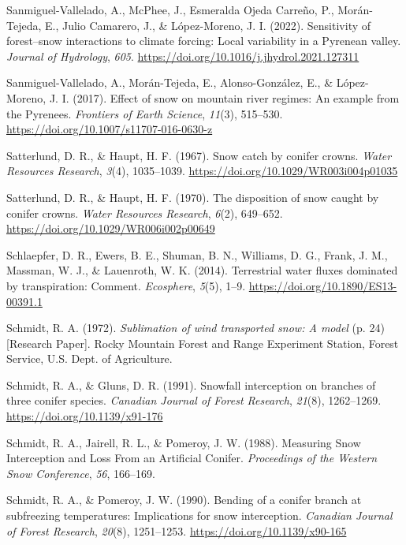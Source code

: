 \documentclass[
  letterpaper,
]{tex/uofsthesis-cs}
\newlength{\cslhangindent}
\newenvironment{CSLReferences}[2] %
 {\begin{list}{}{%
  \setlength{\itemindent}{0pt}
  \setlength{\leftmargin}{0pt}
  \setlength{\parsep}{0pt}
  \ifodd #1
   \setlength{\leftmargin}{\cslhangindent}
   \setlength{\itemindent}{-1\cslhangindent}
  \fi
  \setlength{\itemsep}{#2\baselineskip}}}
 {\end{list}}
\begin{document}
\begin{CSLReferences}{1}{0}
Sanmiguel-Vallelado, A., McPhee, J., Esmeralda Ojeda Carreño, P.,
Morán-Tejeda, E., Julio Camarero, J., \& López-Moreno, J. I. (2022).
Sensitivity of forest--snow interactions to climate forcing: {Local}
variability in a {Pyrenean} valley. \emph{Journal of Hydrology},
\emph{605}. \url{https://doi.org/10.1016/j.jhydrol.2021.127311}

Sanmiguel-Vallelado, A., Morán-Tejeda, E., Alonso-González, E., \&
López-Moreno, J. I. (2017). Effect of snow on mountain river regimes: An
example from the {Pyrenees}. \emph{Frontiers of Earth Science},
\emph{11}(3), 515--530. \url{https://doi.org/10.1007/s11707-016-0630-z}

Satterlund, D. R., \& Haupt, H. F. (1967). Snow catch by conifer crowns.
\emph{Water Resources Research}, \emph{3}(4), 1035--1039.
\url{https://doi.org/10.1029/WR003i004p01035}

Satterlund, D. R., \& Haupt, H. F. (1970). The disposition of snow
caught by conifer crowns. \emph{Water Resources Research}, \emph{6}(2),
649--652. \url{https://doi.org/10.1029/WR006i002p00649}

Schlaepfer, D. R., Ewers, B. E., Shuman, B. N., Williams, D. G., Frank,
J. M., Massman, W. J., \& Lauenroth, W. K. (2014). Terrestrial water
fluxes dominated by transpiration: {Comment}. \emph{Ecosphere},
\emph{5}(5), 1--9. \url{https://doi.org/10.1890/ES13-00391.1}

Schmidt, R. A. (1972). \emph{Sublimation of wind transported snow: A
model} (p. 24) {[}Research Paper{]}. {Rocky Mountain Forest and Range
Experiment Station, Forest Service, U.S. Dept. of Agriculture}.

Schmidt, R. A., \& Gluns, D. R. (1991). Snowfall interception on
branches of three conifer species. \emph{Canadian Journal of Forest
Research}, \emph{21}(8), 1262--1269.
\url{https://doi.org/10.1139/x91-176}

Schmidt, R. A., Jairell, R. L., \& Pomeroy, J. W. (1988). Measuring
{Snow Interception} and {Loss From} an {Artificial Conifer}.
\emph{Proceedings of the {Western Snow Conference}}, \emph{56},
166--169.

Schmidt, R. A., \& Pomeroy, J. W. (1990). Bending of a conifer branch at
subfreezing temperatures: Implications for snow interception.
\emph{Canadian Journal of Forest Research}, \emph{20}(8), 1251--1253.
\url{https://doi.org/10.1139/x90-165}


\end{CSLReferences}
\end{document}
